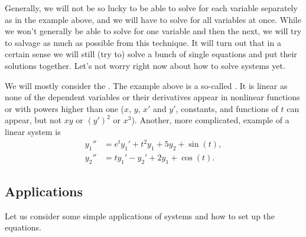 Generally, we will not be so lucky to be able to solve for
each variable separately as in the 
example above, and we will have to solve for all variables at once.
While we won't generally be able to solve for one variable and then the
next, we will try to salvage as much as possible from this technique.
It will turn out that in a certain sense we will still (try to) solve
a bunch of single equations and put their solutions together.  Let's not
worry right now about how to solve systems yet.

We will mostly consider the \emph{}.  The example
above is a so-called \emph{}.
It is linear as none of the dependent variables or their derivatives
appear in nonlinear functions or with powers
higher than one ($x$, $y$, $x'$ and $y'$, constants, and functions of $t$
can appear, but not $xy$ or ${(y')}^2$ or $x^3$).  Another, more
complicated, example of a linear system is
\begin{equation*}
\begin{aligned}
y_1'' &= e^t y_1' + t^2 y_1 + 5 y_2 + \sin(t), \\
y_2'' &= t y_1'-y_2' + 2 y_1 + \cos(t).
\end{aligned}
\end{equation*}

\subsection{Applications}

Let us consider some simple applications of systems and how to set up the
equations.

